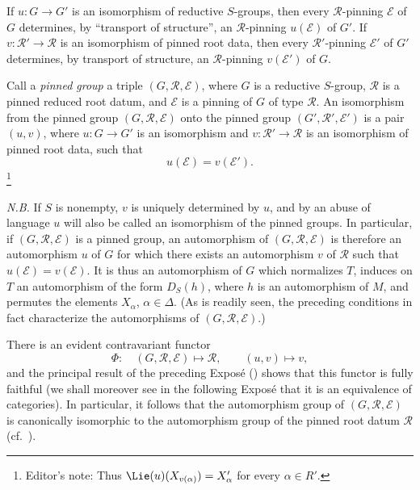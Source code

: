 If \(u:G\to G'\) is an isomorphism of reductive \(S\)-groups, then
every \(\mathscr R\)-pinning \(\mathcal E\) of \(G\) determines, by
``transport of structure'', an \(\mathscr R\)-pinning
\(u(\mathcal E)\) of \(G'\). If
\(v:\mathscr R'\to\mathscr R\) is an isomorphism of pinned root data,
then every \(\mathscr R'\)-pinning \(\mathcal E'\) of \(G'\)
determines, by transport of structure, an \(\mathscr R\)-pinning
\(v(\mathcal E')\) of \(G\).

Call a \emph{pinned group} a triple \((G,\mathscr R,\mathcal E)\),
where \(G\) is a reductive \(S\)-group, \(\mathscr R\) is a pinned
reduced root datum, and \(\mathcal E\) is a pinning of \(G\) of type
\(\mathscr R\). An isomorphism from the pinned group
\((G,\mathscr R,\mathcal E)\) onto the pinned group
\((G',\mathscr R',\mathcal E')\) is a pair \((u,v)\), where
\(u:G\to G'\) is an isomorphism and
\(v:\mathscr R'\to\mathscr R\) is an isomorphism of pinned root data,
such that
\[
  u(\mathcal E)=v(\mathcal E').
\]
\footnote{Editor's note: Thus
\(\Lie(u)(X_{v(\alpha)})=X'_\alpha\) for every
\(\alpha\in R'\).}

\textit{N.B.} If \(S\) is nonempty, \(v\) is uniquely determined by
\(u\), and by an abuse of language \(u\) will also be called an
isomorphism of the pinned groups. In particular, if
\((G,\mathscr R,\mathcal E)\) is a pinned group, an automorphism of
\((G,\mathscr R,\mathcal E)\) is therefore an automorphism \(u\) of
\(G\) for which there exists an automorphism \(v\) of \(\mathscr R\)
such that \(u(\mathcal E)=v(\mathcal E)\). It is thus an automorphism
of \(G\) which normalizes \(T\), induces on \(T\) an automorphism of
the form \(D_S(h)\), where \(h\) is an automorphism of \(M\), and
permutes the elements \(X_\alpha\), \(\alpha\in\Delta\).
\textup{(As is readily seen, the preceding conditions in fact
characterize the automorphisms of
\((G,\mathscr R,\mathcal E)\).)}

There is an evident contravariant functor
\[
  \Phi:\quad
  (G,\mathscr R,\mathcal E)\longmapsto\mathscr R,
  \qquad
  (u,v)\longmapsto v,
\]
and the principal result of the preceding Exposé
\textup{()} shows that this functor is fully faithful
\textup{(we shall moreover see in the following Exposé that it is an
equivalence of categories)}. In particular, it follows that the
automorphism group of \((G,\mathscr R,\mathcal E)\) is canonically
isomorphic to the automorphism group of the pinned root datum
\(\mathscr R\) \textup{(cf.\ )}.

